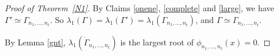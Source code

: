 \documentclass[10pt,a4paper]{amsart}
\numberwithin{equation}{section}
\begin{document}
\begin{proof}[Proof of Theorem~\ref{N1}]
By Claims \ref{onene}, \ref{complete} and \ref{large}, we have $\Gamma'\simeq \Gamma_{n_1, \dots, n_t}$. 
So  $\lambda_1(\Gamma)=\lambda_1(\Gamma')=\lambda_1(\Gamma_{n_1, \dots, n_t})$, and $\Gamma\simeq \Gamma_{n_1, \dots, n_t}$.
%

By Lemma \ref{gnt}, 
$\lambda_1(\dot\Gamma_{n_1, \dots, n_t})$ is the largest root of $\phi_{n_1, \dots, n_t}(x)=0$. 
\end{proof}
\end{document}
